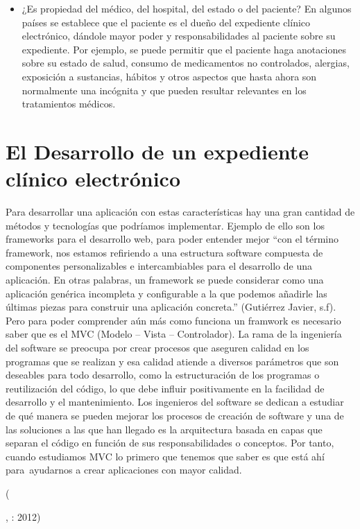 \begin{itemize}
  \item ¿Es propiedad del médico, del hospital, del estado o del paciente? En algunos países se establece que el paciente es el dueño del expediente clínico electrónico, dándole mayor poder y responsabilidades al paciente sobre su expediente. Por ejemplo, se puede permitir que el paciente haga anotaciones sobre su estado de salud, consumo de medicamentos no controlados, alergias, exposición a sustancias, hábitos y otros aspectos que hasta ahora son normalmente una incógnita y que pueden resultar relevantes en los tratamientos médicos. \cite{marco2}

\end{itemize}

\section{El Desarrollo de un expediente clínico electrónico}

\begin{center}
  \begin{minipage}{0.9\linewidth}
    \vspace{5pt}%
    {\small

     Para desarrollar una aplicación con estas características hay una gran cantidad de métodos y tecnologías que podríamos implementar. Ejemplo de ello son los frameworks para el desarrollo web, para poder entender mejor “con el término framework, nos estamos refiriendo a una estructura software compuesta de componentes personalizables e intercambiables para el desarrollo de una aplicación. En otras palabras, un framework se puede considerar como una aplicación genérica incompleta y configurable a la que podemos añadirle las últimas piezas para construir una aplicación concreta.” (Gutiérrez Javier, s.f).
    Pero para poder comprender aún más como funciona un framwork es necesario saber que es el MVC (Modelo – Vista – Controlador).
    La rama de la ingeniería del software se preocupa por crear procesos que aseguren calidad en los programas que se realizan y esa calidad atiende a diversos parámetros que son deseables para todo desarrollo, como la estructuración de los programas o reutilización del código, lo que debe influir positivamente en la facilidad de desarrollo y el mantenimiento.
    Los ingenieros del software se dedican a estudiar de qué manera se pueden mejorar los procesos de creación de software y una de las soluciones a las que han llegado es la arquitectura basada en capas que separan el código en función de sus responsabilidades o conceptos. Por tanto, cuando estudiamos MVC lo primero que tenemos que saber es que está ahí para ayudarnos a crear aplicaciones con mayor calidad.
    }
    \begin{flushright}
      (\author{Gutiérrez Javier.},
      : 2012)
    \end{flushright}
      \vspace{5pt}%
  \end{minipage}
\end{center}

